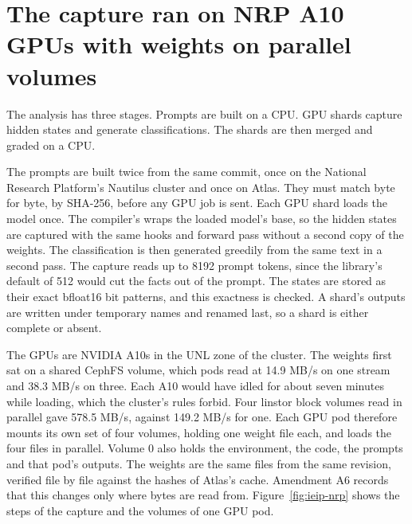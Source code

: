 \section{The capture ran on NRP A10 GPUs with weights on parallel volumes}

The analysis has three stages.
Prompts are built on a CPU.
GPU shards capture hidden states and generate classifications.
The shards are then merged and graded on a CPU.

The prompts are built twice from the same commit, once on the National Research Platform's
Nautilus cluster and once on Atlas.
They must match byte for byte, by SHA-256, before any GPU job is sent.
Each GPU shard loads the model once.
The compiler's  wraps the loaded model's base, so the hidden
states are captured with the same hooks and forward pass without a second copy of the weights.
The classification is then generated greedily from the same text in a second pass.
The capture reads up to 8192 prompt tokens, since the library's default of 512 would cut the
facts out of the prompt.
The states are stored as their exact bfloat16 bit patterns, and this exactness is checked.
A shard's outputs are written under temporary names and renamed last, so a shard is either
complete or absent.

The GPUs are NVIDIA A10s in the UNL zone of the cluster.
The weights first sat on a shared CephFS volume, which pods read at 14.9 MB/s on one stream and
38.3 MB/s on three.
Each A10 would have idled for about seven minutes while loading, which the cluster's rules
forbid.
Four linstor block volumes read in parallel gave 578.5 MB/s, against 149.2 MB/s for one.
Each GPU pod therefore mounts its own set of four volumes, holding one weight file each, and
loads the four files in parallel.
Volume 0 also holds the environment, the code, the prompts and that pod's outputs.
The weights are the same files from the same revision, verified file by file against the
hashes of Atlas's cache.
Amendment A6 records that this changes only where bytes are read from.
Figure~\ref{fig:ieip-nrp} shows the steps of the capture and the volumes of one GPU pod.

